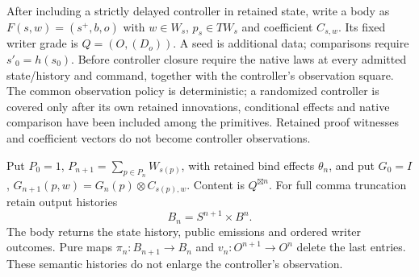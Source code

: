 \documentclass[11pt]{article}
\begin{document}
After including a strictly delayed controller in retained state, write a body as $F(s,w)=(s^+,b,o)$ with $w\in W_s$, $p_s\in TW_s$ and coefficient $C_{s,w}$. Its fixed writer grade is $Q=(O,(D_o))$. A seed is additional data; comparisons require $s'_0=h(s_0)$. Before controller closure require the native laws at every admitted state/history and command, together with the controller's observation square. The common observation policy is deterministic; a randomized controller is covered only after its own retained innovations, conditional effects and native comparison have been included among the primitives. Retained proof witnesses and coefficient vectors do not become controller observations.

Put $P_0=1$, $P_{n+1}=\sum_{p\in P_n}W_{s(p)}$, with retained bind effects $\theta_n$, and put $G_0=I$, $G_{n+1}(p,w)=G_n(p)\otimes C_{s(p),w}$. Content is $Q^{\boxtimes n}$. For full comma truncation retain output histories
\[
 B_n=S^{n+1}\times B^n.
\]
The body returns the state history, public emissions and ordered writer outcomes. Pure maps $\pi_n:B_{n+1}\to B_n$ and $v_n:O^{n+1}\to O^n$ delete the last entries. These semantic histories do not enlarge the controller's observation.
\end{document}

